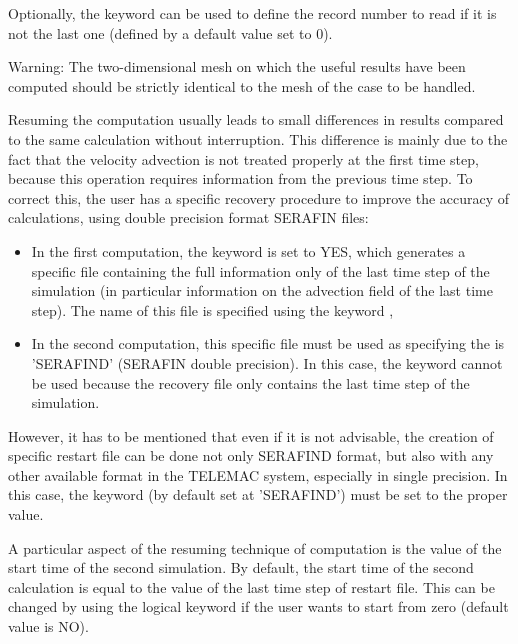 Optionally, the keyword  can be used to
define the record number to read if it is not the last one (defined by a
default value set to 0).

\begin{WarningBlock}{Warning:}
The two-dimensional mesh on which the useful results have been computed should
be strictly identical to the mesh of the case to be handled.
\end{WarningBlock}

Resuming the computation usually leads to small differences in results
compared to the same calculation without interruption. This difference is
mainly due to the fact that the velocity advection is not treated properly at
the first time step, because this operation requires information from the
previous time step. To correct this, the user has a specific recovery procedure
to improve the accuracy of calculations, using double precision format SERAFIN
files:

\begin{itemize}
\item In the first computation, the keyword  is set to
YES, which generates a specific file containing the full information only of
the last time step of the simulation (in particular information on the
advection field of the last time step). The name of this file is specified
using the keyword ,

\item In the second computation, this specific file must be used as
 specifying the  is 'SERAFIND' (SERAFIN double precision). In this case, the
keyword  cannot be used because the recovery
file only contains the last time step of the simulation.
\end{itemize}

However, it has to be mentioned that even if it is not advisable, the creation
of specific restart file can be done not only SERAFIND format, but also with
any other available format in the TELEMAC system, especially in single
precision. In this case, the keyword  (by default
set at 'SERAFIND') must be set to the proper value.

A particular aspect of the resuming technique of computation is the value of
the start time of the second simulation. By default, the start time of the
second calculation is equal to the value of the last time step of restart file.
This can be changed by using the logical keyword  if the user wants to start from zero (default value is NO).

